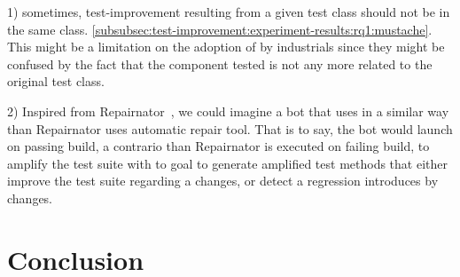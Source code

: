 1) sometimes, test-improvement resulting from a given test class should not be in the same class. \eg \autoref{subsubsec:test-improvement:experiment-results:rq1:mustache}.
This might be a limitation on the adoption of \dspot by industrials since they might be confused by the fact that the component tested is not any more related to the original test class.

2) Inspired from Repairnator~\cite{urli:hal-01691496}, we could imagine a bot that uses \dspot in a similar way than Repairnator uses automatic repair tool.
That is to say, the bot would launch \dspot on passing build, a contrario than Repairnator is executed on failing build, to amplify the test suite with to goal to generate amplified test methods that either improve the test suite regarding a changes, or detect a regression introduces by changes.

\section{Conclusion}
\label{sec:conclusion:conclusion}



